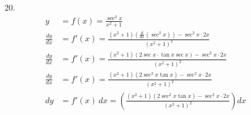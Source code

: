 \documentclass[12pt]{article}
\begin{document}
\begin{enumerate}
        \item[20.] 
            \begin{align*}
            y &= f(x) = \frac{\sec^2{x}}{x^2+1} \\
            \frac{dy}{dx} &= f'(x) = \frac{(x^2+1)\left(\frac{d}{dx}(\sec^2{x})\right) - \sec^2{x}\cdot 2x }{ (x^2+1)^2}\\
            \frac{dy}{dx} &= f'(x) = \frac{(x^2+1)\left(  2\sec{x}\cdot\tan{x}\sec{x}  \right) - \sec^2{x}\cdot 2x }{ (x^2+1)^2}\\
            \frac{dy}{dx} &= f'(x) = \frac{(x^2+1)\left(  2\sec^2{x}\tan{x} \right) - \sec^2{x}\cdot 2x }{ (x^2+1)^2}\\
            dy &= f'(x)~dx = \left( \frac{(x^2+1)\left(  2\sec^2{x}\tan{x} \right) - \sec^2{x}\cdot 2x }{ (x^2+1)^2} \right)dx\\
            \end{align*}
    \end{enumerate}
\end{document}
